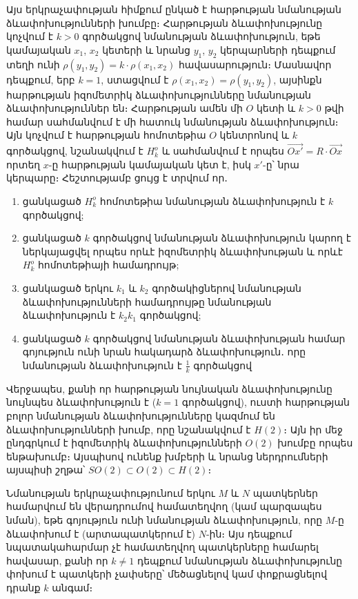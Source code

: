 \documentclass[./main.tex]{subfiles}
\begin{document}
\par Այս երկրաչափության հիմքում ընկած է հարթության նմանության ձևափոխությունների խումբը։ Հարթության ձևափոխությունը կոչվում է $k>0$ գործակցով նմանության
ձևափոխություն, եթե կամայական $x_1$, $x_2$ կետերի և նրանց $y_1$, $y_2$ կերպարների դեպքում տեղի ունի $\rho(y_1,y_2) = k \cdot \rho(x_1,x_2)$ հավասարություն։
Մասնավոր դեպքում, երբ $k=1$, ստացվում է $\rho(x_1,x_2) = \rho(y_1,y_2)$, այսինքն հարթության իզոմետրիկ ձևափոխությունները նմանության ձևափոխություններ են։ Հարթության ամեն մի $O$ կետի
և $k>0$ թվի համար սահմանվում է մի հատուկ նմանության ձևափոխություն։ Այն կոչվում է հարթության հոմոտեթիա $O$ կենտրոնով և $k$ գործակցով, նշանակվում է $H_k^o$ և
սահմանվում է որպես $\overrightarrow{Ox'} = R \cdot \overrightarrow{Ox}$ որտեղ $x$-ը հարթության կամայական կետ է, իսկ $x'$-ը՝ նրա կերպարը։ Հեշտությամբ ցույց է տրվում որ․
\begin{enumerate}
    \item[1.] ցանկացած $H_k^o$ հոմոտեթիա նմանության ձևափոխություն է $k$ գործակցով;
    \item[2.] ցանկացած $k$ գործակցով նմանության ձևափոխություն կարող է ներկայացվել որպես որևէ իզոմետրիկ ձևափոխության և որևէ $H_k^o$ հոմոտեթիայի համադրույթ;
    \item[3.] ցանկացած երկու $k_1$ և $k_2$ գործակիցներով նմանության ձևափոխությունների համադրույթը նմանության ձևափոխություն է $k_2 k_1$ գործակցով;

    \item[4.] ցանկացած $k$ գործակցով նմանության ձևափոխության համար գոյություն ունի նրան հակադարձ ձևափոխություն․ որը նմանության ձևափոխություն է $\frac{1}{k}$ գործակցով
\end{enumerate}



\par Վերջապես, քանի որ հարթության նույնական ձևափոխությունը նույնպես ձևափոխություն է ($k=1$ գործակցով), ուստի հարթության բոլոր նմանության ձևափոխությունները
կազմում են ձևափոխությունների խումբ, որը նշանակվում է $H(2)$։ Այն իր մեջ ընդգրկում է իզոմետրիկ ձևափոխությունների $O(2)$ խումբը որպես ենթախումբ։ Այսպիսով
ունենք խմբերի և նրանց ներդրումների այսպիսի շղթա՝ $SO(2) \subset O(2) \subset H(2)$։

\par Նմանության երկրաչափությունում երկու $M$ և $N$ պատկերներ համարվում են վերադրումով համատեղվող (կամ պարզապես նման), եթե գոյություն ունի
նմանության ձևափոխություն, որը $M$-ը ձևափոխում է (արտապատկերում է) $N$-ին։ 
Այս դեպքում նպատակահարմար չէ համատեղվող պատկերները համարել հավասար, քանի որ $k \neq 1$ դեպքում նմանության ձևափոխությունը փոխում է պատկերի չափսերը՝ մեծացնելով 
կամ փոքրացնելով դրանք $k$ անգամ։
\end{document}
